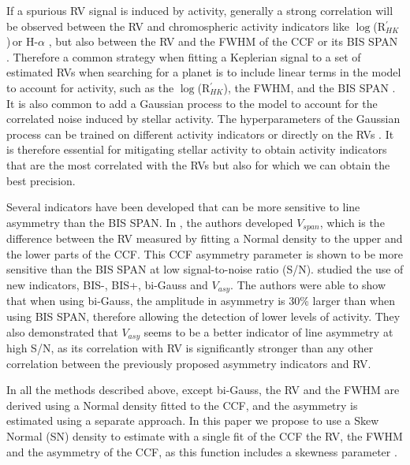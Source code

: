\documentclass{aa}
\def\logrhk{$\log$(R$^{\prime}_{HK}$)}
\begin{document}
If a spurious RV signal is induced by activity, generally a strong correlation will be observed between the RV and chromospheric activity indicators like \logrhk\,or H-$\alpha$ \citep{Boisse-2009,Dumusque-2012,Robertson-2014}, but also between the RV and the FWHM of the CCF or its BIS SPAN \citep[][]{Queloz-2001,Boisse-2009,Queloz-2009,Dumusque-2016a}. 
%
Therefore a common strategy when fitting a Keplerian signal to a set of estimated RVs when searching for a planet is to include linear terms in the model to account for activity, such as the \logrhk, the FWHM, and the BIS SPAN \citep{Dumusque:2017aa,Feng:2017aa}.
%
It is also common to add a Gaussian process to the model to account for the correlated noise induced by stellar activity. The hyperparameters of the Gaussian process can be trained on different activity indicators \citep{Haywood-2014,Rajpaul-2015} or directly on the RVs \citep{Faria-2016a}. It is therefore essential for mitigating stellar activity to obtain activity indicators that are the most correlated with the RVs but also for which we can obtain the best precision.

Several indicators have been developed that can be more sensitive to line asymmetry than the BIS SPAN. In \citet{Boisse-2011}, the authors developed $V_{span}$, which is the difference between the RV measured by fitting a Normal density to the upper and the lower parts of the CCF. This CCF asymmetry parameter is shown to be more sensitive than the BIS SPAN at low signal-to-noise ratio (S/N).
%
\citet{Figueira-2013} studied the use of new indicators, BIS-, BIS+, bi-Gauss and $V_{asy}$. The authors were able to show that when using bi-Gauss, the amplitude in asymmetry is 30\% larger than when using BIS SPAN, therefore allowing the detection of lower levels of activity. They also demonstrated that $V_{asy}$ seems to be a better indicator of line asymmetry at high S/N, as its correlation with RV is significantly stronger than any other correlation between the previously proposed asymmetry indicators and RV.

In all the methods described above, except bi-Gauss, the RV and the FWHM are derived using a Normal density fitted to the CCF, and the asymmetry is estimated using a separate approach. 
%
In this paper we propose to use a Skew Normal (SN) density to estimate with a single fit of the CCF the RV, the FWHM and the asymmetry of the CCF, as this function includes a skewness parameter \citep[][]{Azzalini1985}. 
\end{document}
